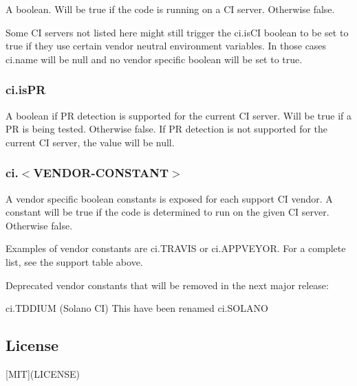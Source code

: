 A boolean. Will be {\ttfamily true} if the code is running on a CI server. Otherwise {\ttfamily false}.

Some CI servers not listed here might still trigger the {\ttfamily ci.\+is\+CI} boolean to be set to {\ttfamily true} if they use certain vendor neutral environment variables. In those cases {\ttfamily ci.\+name} will be {\ttfamily null} and no vendor specific boolean will be set to {\ttfamily true}.

\subsubsection*{{\ttfamily ci.\+is\+PR}}

A boolean if PR detection is supported for the current CI server. Will be {\ttfamily true} if a PR is being tested. Otherwise {\ttfamily false}. If PR detection is not supported for the current CI server, the value will be {\ttfamily null}.

\subsubsection*{{\ttfamily ci.$<$V\+E\+N\+D\+O\+R-\/\+C\+O\+N\+S\+T\+A\+NT$>$}}

A vendor specific boolean constants is exposed for each support CI vendor. A constant will be {\ttfamily true} if the code is determined to run on the given CI server. Otherwise {\ttfamily false}.

Examples of vendor constants are {\ttfamily ci.\+T\+R\+A\+V\+IS} or {\ttfamily ci.\+A\+P\+P\+V\+E\+Y\+OR}. For a complete list, see the support table above.

Deprecated vendor constants that will be removed in the next major release\+:


\begin{DoxyItemize}
\item {\ttfamily ci.\+T\+D\+D\+I\+UM} (Solano CI) This have been renamed {\ttfamily ci.\+S\+O\+L\+A\+NO}
\end{DoxyItemize}

\subsection*{License}

\mbox{[}M\+IT\mbox{]}(L\+I\+C\+E\+N\+SE) 